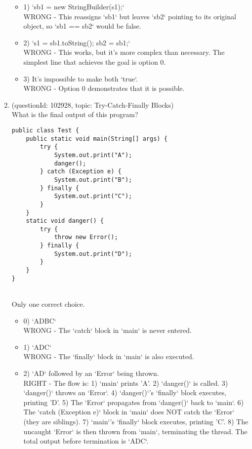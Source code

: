\documentclass[12pt]{article}
\begin{document}
\begin{enumerate}[label=(\arabic*)]
\begin{itemize}
\item 1) `sb1 = new StringBuilder(s1);`
 \\ 
WRONG - This reassigns `sb1` but leaves `sb2` pointing to its original object, so `sb1 == sb2` would be false.

\item 2) `s1 = sb1.toString(); sb2 = sb1;`
 \\ 
WRONG - This works, but it's more complex than necessary. The simplest line that achieves the goal is option 0.

\item 3) It's impossible to make both `true`.
 \\ 
WRONG - Option 0 demonstrates that it is possible.

\end{itemize}
\item (questionId: 102928, topic: Try-Catch-Finally Blocks) \\ 
What is the final output of this program?
\begin{verbatim}
public class Test {
    public static void main(String[] args) {
        try {
            System.out.print("A");
            danger();
        } catch (Exception e) {
            System.out.print("B");
        } finally {
            System.out.print("C");
        }
    }
    static void danger() {
        try {
            throw new Error();
        } finally {
            System.out.print("D");
        }
    }
}
\end{verbatim}
\\ \noindent Only one correct choice. 
\begin{itemize}
\item 0) `ADBC`
 \\ 
WRONG - The `catch` block in `main` is never entered.

\item 1) `ADC`
 \\ 
WRONG - The `finally` block in `main` is also executed.

\item 2) `AD` followed by an `Error` being thrown.
 \\ 
RIGHT - The flow is: 1) `main` prints 'A'. 2) `danger()` is called. 3) `danger()` throws an `Error`. 4) `danger()`'s `finally` block executes, printing 'D'. 5) The `Error` propagates from `danger()` back to `main`. 6) The `catch (Exception e)` block in `main` does NOT catch the `Error` (they are siblings). 7) `main`'s `finally` block executes, printing 'C'. 8) The uncaught `Error` is then thrown from `main`, terminating the thread. The total output before termination is `ADC`.


\end{itemize}
\end{enumerate}
\end{document}
